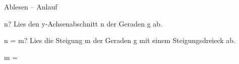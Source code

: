 \setcounter{aufgabe}{0}

\begin{aufgabe}{Ablesen – Anlauf}
\begin{teile}
\teil n? Lies den y-Achsenabschnitt n der Geraden g ab.

\begin{ksys}[xmin=-5,xmax=5,ymin=-5,ymax=5,ablesen]  \end{ksys}
n = \leerfeld
\teil m? Lies die Steigung m der Geraden g mit einem Steigungsdreieck ab.

\begin{ksys}[xmin=-5,xmax=5,ymin=-5,ymax=5,ablesen]  \end{ksys}
m = \leerfeld
\end{teile}
\end{aufgabe}

